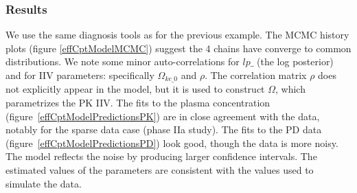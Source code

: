 \documentclass[11pt]{amsart}
\begin{document}
\subsubsection*{Results} We use the same diagnosis tools as for the previous example. The MCMC history plots (figure \ref{effCptModelMCMC}) suggest the 4 chains have converge to common distributions. We note some minor auto-correlations for $lp\_$ (the log posterior) and for IIV parameters: specifically $\Omega_{ke\_0}$ and $\rho$. The correlation matrix $\rho$ does not explicitly appear in the model, but it is used to construct $\Omega$, which parametrizes the PK IIV. The fits to the plasma concentration  (figure~\ref{effCptModelPredictionsPK}) are in close agreement with the data, notably for the sparse data case (phase IIa study). The fits to the PD data (figure~\ref{effCptModelPredictionsPD}) look good, though the data is more noisy. The model reflects the noise by producing larger confidence intervals. The estimated values of the parameters are consistent with the values used to simulate the data. 
\end{document}
